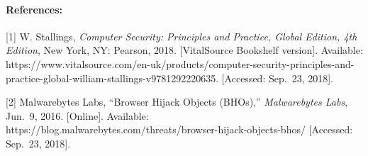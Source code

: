 \documentclass[11pt]{article}
\begin{document}
\hypertarget{references}{%
\paragraph{References:}\label{references}}

{[}1{]} W. Stallings, \emph{Computer Security: Principles and Practice,
Global Edition, 4th Edition}, New York, NY: Pearson, 2018.
{[}VitalSource Bookshelf version{]}. Available:
https://www.vitalsource.com/en-uk/products/computer-security-principles-and-practice-global-william-stallings-v9781292220635.
{[}Accessed: Sep.~23, 2018{]}.

{[}2{]} Malwarebytes Labs, ``Browser Hijack Objects (BHOs),''
\emph{Malwarebytes Labs}, Jun.~9, 2016. {[}Online{]}. Available:
https://blog.malwarebytes.com/threats/browser-hijack-objects-bhos/
{[}Accessed: Sep.~23, 2018{]}.


    
    
    
    
\end{document}
